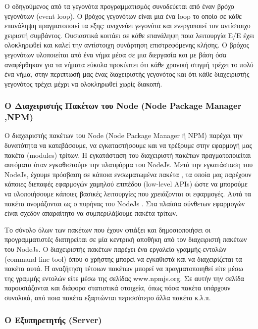 		Ο οδηγούμενος από τα γεγονότα προγραμματισμός συνοδεύεται από έναν βρόχο γεγονότων (event loop). Ο βρόχος γεγονότων είναι μια ένα loop το οποίο σε κάθε επανάληψη πραγματοποιεί τα εξης: ανιχνεύει γεγονότα και ενεργοποιεί τον αντίστοιχο χειριστή συμβάντος. Ουσιαστικά κοιτάει σε κάθε επανάληψη ποια λειτουργία Ε/Ε έχει ολοκληρωθεί και καλεί την αντίστοιχη συνάρτηση επιστρεφόμενης κλήσης. Ο βρόχος γεγονότων υλοποιείται από ένα νήμα μέσα σε μια διεργασία και με βάση όσα αναφέρθηκαν για τα νήματα εύκολα προκύπτει ότι κάθε χρονική στιγμή τρέχει το πολύ ένα νήμα, στην περιπτωσή μας ένας διαχειριστής γεγονότος και ότι κάθε διαχειριστής γεγονότος τρέχει μέχρι να ολοκληρωθεί χωρίς διακοπή.
		
		\subsubsection{Ο Διαχειριστής Πακέτων του Node (Node Package Manager ,NPM)}
		

		Ο διαχειριστής πακέτων του Node (Node Package Manager ή NPM) παρέχει την δυνατότητα να κατεβάσουμε, να εγκαταστήσουμε και να τρέξουμε στην εφαρμογή μας πακέτα (modules) τρίτων. H εγκατάσταση του διαχειριστή  πακέτων πραγματοποιείται  αυτόματα όταν εγκαθιστούμε την πλατφόρμα του NodeJs. Μετά την εγκατάσταση του NodeJs, έχουμε πρόσβαση σε κάποια ενσωματωμένα πακέτα , τα οποία μας παρέχουν κάποιες διεπαφές εφαρμογών χαμηλού επιπέδου (low-level APIs) ώστε να μπορούμε να υλοποιήσουμε κάποιες βασικές λειτουργίες που χρειάζονται οι εφαρμογές. Αυτά τα πακέτα ονομάζονται ως ο πυρήνας του NodeJs . Στα πλαίσια σύνθετων εφαρμογών είναι σχεδόν απαραίτητο να συμπεριλάβουμε πακέτα τρίτων.


		Το σύνολο όλων των πακέτων που έχουν φτιάξει και δημοσιοποιήσει οι προγραμματιστές διατηρείται σε μία κεντρική αποθήκη από τον διαχειριστή πακέτων του NodeJs. Ο διαχειριστής πακέτων παρέχει ένα εργαλείο γραμμής-εντολών (command-line tool) όπου ο χρήστης μπορεί να εγκαθιστά και να διαχειρίζεται τα πακέτα αυτά. H αναζήτηση τέτοιων πακέτων μπορεί να πραγματοποιηθεί είτε  μέσω της γραμμής εντολών είτε μέσω της σελίδας www.npmjs.org. Σε αυτήν την σελίδα παρουσιάζονται και διάφορα στατιστικά στοιχεία, όπως πόσα πακέτα υπάρχουν συνολικά, από ποια πακέτα εξαρτώνται περισσότερο άλλα πακέτα κ.λ.π. \cite{cantelon}

	\cite{Kaufm2009}	
		
		
	\subsubsection{Ο Εξυπηρετητής (Server)}
	
